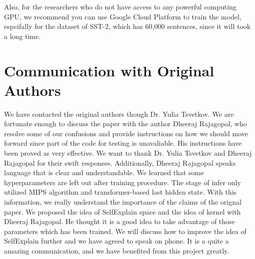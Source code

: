 \documentclass{article}
\begin{document}
Also, for the researchers who do not have access to any powerful computing GPU, we recommend you can use 
Google Cloud Platform to train the model, espcifally for the dataset of SST-2, which has 60,000 sentences, 
since it will took a long time. 


\section*{Communication with Original Authors}

We have contacted the original authors though Dr. Yulia Tsvetkov. We are fortunate enough to 
discuss the paper with the author Dheeraj Rajagopal, who resolve some of our confusions and 
provide instructions on how we should move forward since part of the code for testing is 
unavaliable. His instructions have been proved as very effective. We want to thank Dr. Yulia Tsvetkov and Dheeraj Rajagopal for their 
swift responses. Additionally, Dheeraj Rajagopal speaks language that is clear and understandable. We learned that 
some hyperparameters are left out after training procedure. The stage of infer only utilized MIPS algorithm and 
transformer-based last hidden state. With this information, we really understand the importance of the claims of 
the orignal paper. We proposed the idea of SelfExplain space and the idea of kernel with Dheeraj Rajagopal. 
He thought it is a good idea to take advantage of those parameters which has been trained. We will discuss how 
to improve the idea of SelfExplain further and we have agreed to speak on phone. It is a quite a amazing communication,
and we have benefited from this project greatly.

\newpage



\end{document}
